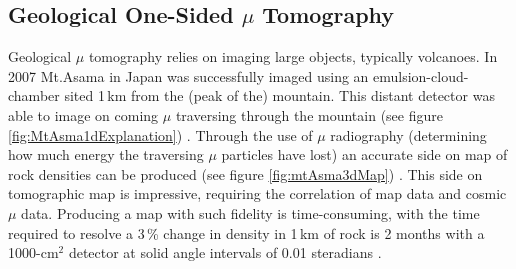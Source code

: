 
\vspace{3cm}

\subsection{Geological One-Sided $\mu$ Tomography}  \label{sec:geologicalTomography} %
Geological $\mu$ tomography relies on imaging large objects, typically volcanoes. In 2007 Mt.Asama in Japan was successfully imaged using an emulsion-cloud-chamber sited 1\,km from the (peak of the) mountain. This distant detector was able to image on coming $\mu$ traversing through the mountain (see figure \ref{fig:MtAsma1dExplanation}) \cite{Tanaka_mtAsama_2007}. Through the use of $\mu$ radiography (determining how much energy the traversing $\mu$ particles have lost) an accurate side on map of rock densities can be produced (see figure \ref{fig:mtAsma3dMap}) \cite{Tanaka_mtAsama_2007}. This side on tomographic map is impressive, requiring the correlation of map data and cosmic $\mu$ data. Producing a map with such fidelity is time-consuming, with the time required to resolve a 3\,\% change in density in 1\,km of rock is 2 months with a 1000-cm$^2$ detector at solid angle intervals of 0.01 steradians \cite{Tanaka_mtAsama_2007}.

